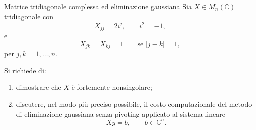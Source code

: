 \documentclass[a4paper]{article}
\begin{document}
\begin{snippetexercise}{Matrice tridiagonale complessa ed eliminazione gaussiana}
    Sia \(X\in M_n(\mathbb{C})\) tridiagonale con
    \[
        X_{jj}=2i^j,
        \qquad
        i^2=-1,
    \]
    e
    \[
        X_{jk}=X_{kj}=1
        \qquad
        \text{se } |j-k|=1,
    \]
    per \(j,k=1,\dots,n\).

    Si richiede di:
    \begin{enumerate}
        \item dimostrare che \(X\) è fortemente nonsingolare;
        \item discutere, nel modo più preciso possibile, il costo computazionale del metodo di eliminazione gaussiana senza pivoting applicato al sistema lineare
            \[
                Xy=b,
                \qquad
                b\in\mathbb{C}^n.
            \]
    \end{enumerate}
\end{snippetexercise}
\end{document}
